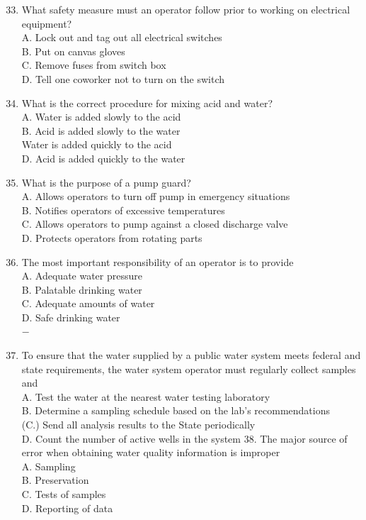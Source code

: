 \documentclass[10pt]{article}
\begin{document}
\begin{enumerate}
  \setcounter{enumi}{32}
  \item What safety measure must an operator follow prior to working on electrical equipment?\\
A. Lock out and tag out all electrical switches\\
B. Put on canvas gloves\\
C. Remove fuses from switch box\\
D. Tell one coworker not to turn on the switch

  \item What is the correct procedure for mixing acid and water?\\
A. Water is added slowly to the acid\\
B. Acid is added slowly to the water\\
Water is added quickly to the acid\\
D. Acid is added quickly to the water

  \item What is the purpose of a pump guard?\\
A. Allows operators to turn off pump in emergency situations\\
B. Notifies operators of excessive temperatures\\
C. Allows operators to pump against a closed discharge valve\\
D. Protects operators from rotating parts

  \item The most important responsibility of an operator is to provide\\
A. Adequate water pressure\\
B. Palatable drinking water\\
C. Adequate amounts of water\\
D. Safe drinking water\\
$-$

  \item To ensure that the water supplied by a public water system meets federal and state requirements, the water system operator must regularly collect samples and\\
A. Test the water at the nearest water testing laboratory\\
B. Determine a sampling schedule based on the lab's recommendations\\
(C.) Send all analysis results to the State periodically\\
D. Count the number of active wells in the system 38. The major source of error when obtaining water quality information is improper\\
A. Sampling\\
B. Preservation\\
C. Tests of samples\\
D. Reporting of data


\end{enumerate}
\end{document}
